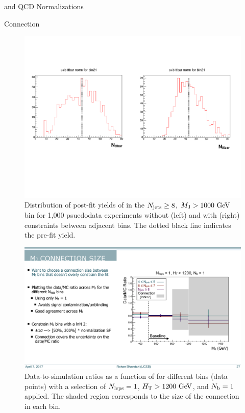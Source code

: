 \begin{section}{\ttbar and QCD Normalizations}
\begin{subsection}{\MJ Connection}
\begin{figure}[tbp!]
\centering
\includegraphics[angle=0,width=0.90\columnwidth]{fig/mj_connection_exps.pdf}
\caption{Distribution of post-fit yields of \ttbar in the $N_{\mathrm{jets}} \geq 8$, $M_{\mathrm{J}} > 1000~\mathrm{Ge\kern -0.1em V}$ bin for 1,000 psuedodata experiments without (left) and with (right) constraints between adjacent \MJ bins.
The dotted black line indicates the pre-fit yield.}
\label{fig:mj_connection_exps}
\end{figure}

\begin{figure}[tbp!]
\centering
\includegraphics[angle=0,width=0.60\columnwidth]{fig/mj_connection.pdf}
\caption{Data-to-simulation ratios as a function of \MJ for different \Njets bins (data points) with a selection of $N_{\mathrm{leps}} = 1$, $H_{\mathrm{T}} > 1200~\mathrm{Ge\kern -0.1em V}$, and $N_{\mathrm{b}} = 1$ applied.
The shaded region corresponds to the size of the \MJ connection in each \MJ bin.}
\label{fig:mj_connection}
\end{figure}

\end{subsection}

\end{section}

